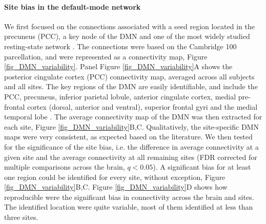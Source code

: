 \documentclass[authoryear]{elsarticle}
\begin{document}
\paragraph{Site bias in the default-mode network} We first focused on the connections associated with a seed region located in the precuneus (PCC), a key node of the DMN and one of the most widely studied resting-state network \citep{Greicius2004}. The connections were based on the Cambridge 100 parcellation, and were represented as a connectivity map, Figure \ref{fig_DMN_variability}. Panel Figure \ref{fig_DMN_variability}A shows the posterior cingulate cortex (PCC) connectivity map, averaged across all subjects and all sites. The key regions of the DMN are easily identifiable, and include the PCC, precuneus, inferior parietal lobule, anterior cingulate cortex, medial pre-frontal cortex (dorsal, anterior and ventral), superior frontal gyri and the medial temporal lobe \citep{Damoiseaux2006,Dansereau2014,Yan2013a}. The average connectivity map of the DMN was then extracted for each site, Figure \ref{fig_DMN_variability}B,C. Qualitatively, the site-specific DMN maps were very consistent, as expected based on the literature. We then tested for the significance of the site bias, i.e. the difference in average connectivity at a given site and the average connectivity at all remaining sites (FDR corrected for multiple comparisons across the brain, $q<0.05$). A significant bias for at least one region could be identified for every site, without exception, Figure \ref{fig_DMN_variability}B,C. Figure \ref{fig_DMN_variability}D shows how reproducible were the significant bias in connectivity across the brain and sites. The identified location were quite variable, most of them identified at less than three sites.
\end{document}
